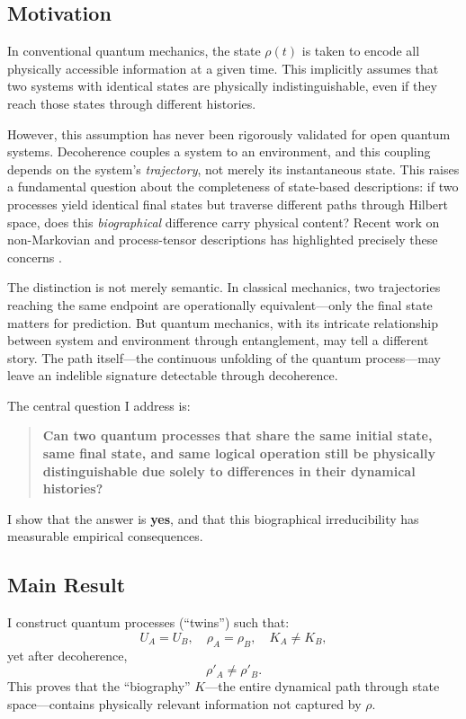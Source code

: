 \documentclass[11pt, onecolumn, letterpaper]{article}
\begin{document}
\subsection{Motivation}
In conventional quantum mechanics, the state $\rho(t)$ is taken to encode all physically accessible information at a given time. This implicitly assumes that two systems with identical states are physically indistinguishable, even if they reach those states through different histories.

However, this assumption has never been rigorously validated for open quantum systems. Decoherence couples a system to an environment, and this coupling depends on the system's \textit{trajectory}, not merely its instantaneous state. This raises a fundamental question about the completeness of state-based descriptions: if two processes yield identical final states but traverse different paths through Hilbert space, does this \textit{biographical} difference carry physical content? Recent work on non-Markovian and process-tensor descriptions has highlighted precisely these concerns \cite{pollock2018nonmarkovian, milz2021quantum}.


The distinction is not merely semantic. In classical mechanics, two trajectories reaching the same endpoint are operationally equivalent---only the final state matters for prediction. But quantum mechanics, with its intricate relationship between system and environment through entanglement, may tell a different story. The path itself---the continuous unfolding of the quantum process---may leave an indelible signature detectable through decoherence.

The central question I address is:
\begin{quote}
\textbf{Can two quantum processes that share the same initial state, same final state, and same logical operation still be physically distinguishable due solely to differences in their dynamical histories?}
\end{quote}
I show that the answer is \textbf{yes}, and that this biographical irreducibility has measurable empirical consequences.

\subsection{Main Result}
I construct quantum processes (``twins'') such that:
\begin{equation}
U_A = U_B, \quad \rho_A = \rho_B, \quad K_A \neq K_B,
\end{equation}
yet after decoherence,
\begin{equation}
\rho'_A \neq \rho'_B.
\end{equation}
This proves that the ``biography'' $K$---the entire dynamical path through state space---contains physically relevant information not captured by $\rho$.
\end{document}
